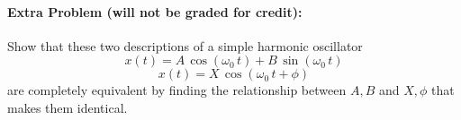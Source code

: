 \documentclass[12pt]{article}
\begin{document}
\paragraph{Extra Problem (will not be graded for credit):}%
Show that these two descriptions of a simple harmonic oscillator
\begin{equation}
x(t) = A\,\cos(\omega_0\,t) + B\,\sin(\omega_0\,t)
\end{equation}
\begin{equation}
x(t) = X\,\cos (\omega_0\,t+\phi)
\end{equation}
are completely equivalent by finding the relationship between $A, B$
and $X, \phi$ that makes them identical.
\end{document}
